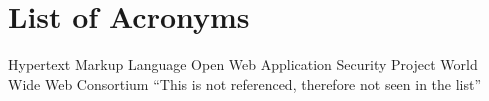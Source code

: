 \section*{List of Acronyms}
\begin{acronym}
         {Hypertext Markup Language}
        {Open Web Application Security Project}
          {World Wide Web Consortium}
       {``This is not referenced, therefore not seen in the list''}
\end{acronym}
